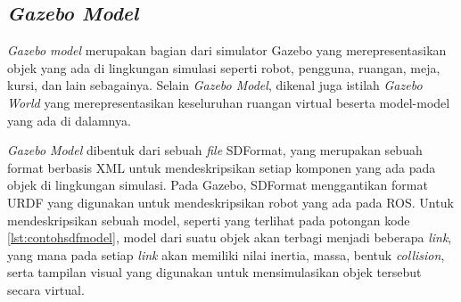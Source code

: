 \subsection{\emph{Gazebo Model}}
\label{subsec:gazebomodel}

\emph{Gazebo model} merupakan bagian dari simulator Gazebo yang merepresentasikan objek yang ada di lingkungan simulasi seperti robot, pengguna, ruangan, meja, kursi, dan lain sebagainya.
Selain \emph{Gazebo Model}, dikenal juga istilah \emph{Gazebo World} yang merepresentasikan keseluruhan ruangan virtual beserta model-model yang ada di dalamnya.



\emph{Gazebo Model} dibentuk dari sebuah \emph{file} SDFormat,
  yang merupakan sebuah format berbasis XML untuk mendeskripsikan setiap komponen yang ada pada objek di lingkungan simulasi.
Pada Gazebo, SDFormat menggantikan format URDF yang digunakan untuk mendeskripsikan robot yang ada pada ROS.
Untuk mendeskripsikan sebuah model,
  seperti yang terlihat pada potongan kode \ref{lst:contohsdfmodel},
  model dari suatu objek akan terbagi menjadi beberapa \emph{link},
  yang mana pada setiap \emph{link} akan memiliki nilai inertia, massa, bentuk \emph{collision}, serta tampilan visual yang digunakan untuk mensimulasikan objek tersebut secara virtual.
